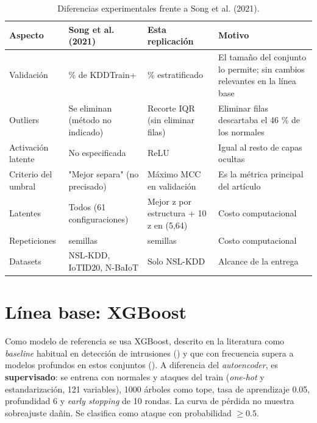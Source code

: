 \documentclass[
  spanish,
  11pt,
]{article}
\begin{document}
\begin{table}[!h]
\centering
\caption{\label{tab:diferencias}Diferencias experimentales frente a Song et al. (2021).}
\centering
\fontsize{8}{10}\selectfont
\begin{tabular}[t]{>{\raggedright\arraybackslash}p{2.3cm}>{\raggedright\arraybackslash}p{3.6cm}>{\raggedright\arraybackslash}p{3.6cm}>{\raggedright\arraybackslash}p{4.6cm}}
\toprule
Aspecto & Song et al. (2021) & Esta replicación & Motivo\\
\midrule
Validación & 10 \% de KDDTrain+ & 20 \% estratificado & El tamaño del conjunto lo permite; sin cambios relevantes en la línea base\\
Outliers & Se eliminan (método no indicado) & Recorte IQR (sin eliminar filas) & Eliminar filas descartaba el 46 \% de los normales\\
Activación latente & No especificada & ReLU & Igual al resto de capas ocultas\\
Criterio del umbral & "Mejor separa" (no precisado) & Máximo MCC en validación & Es la métrica principal del artículo\\
Latentes & Todos (61 configuraciones) & Mejor z por estructura + 10 z en (5,64) & Costo computacional\\
\addlinespace
Repeticiones & 20 semillas & 10 semillas & Costo computacional\\
Datasets & NSL-KDD, IoTID20, N-BaIoT & Solo NSL-KDD & Alcance de la entrega\\
\bottomrule
\end{tabular}
\end{table}

\section{Línea base: XGBoost}\label{sec:linea-base}

Como modelo de referencia se usa XGBoost, descrito en la literatura como \emph{baseline} habitual en
detección de intrusiones () y que con frecuencia supera a modelos profundos en estos
conjuntos (). A diferencia del \emph{autoencoder}, es \textbf{supervisado}: se entrena con normales
y ataques del train (\emph{one-hot} y estandarización, 121 variables), 1000 árboles como tope, tasa de
aprendizaje 0.05, profundidad 6 y \emph{early stopping} de 10 rondas. La curva de pérdida no muestra sobreajuste dañin. Se clasifica como ataque con
probabilidad \(\geq 0.5\).
\end{document}
